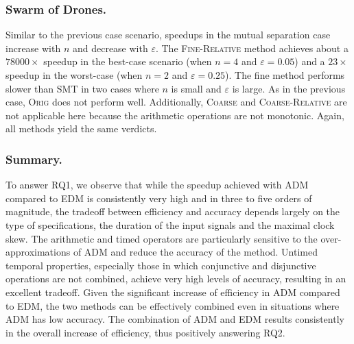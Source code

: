 \subsubsection{Swarm of Drones.}
Similar to the previous case scenario, speedups in the mutual separation case increase with \(n\) and decrease with \(\varepsilon\).
The \textsc{Fine-Relative} method achieves about a $78000\times$ speedup in the best-case scenario (when \(n=4\) and \(\varepsilon=0.05\)) and a $23\times$ speedup in the worst-case (when \(n=2\) and \(\varepsilon=0.25\)).
The fine method performs slower than SMT in two cases where \(n\) is small and \(\varepsilon\) is large.
As in the previous case, \textsc{Orig} does not perform well.
Additionally, \textsc{Coarse} and \textsc{Coarse-Relative} are not applicable here because the arithmetic operations are not monotonic.
Again, all methods yield the same verdicts.

\subsubsection{Summary.} To answer RQ1, we observe that while the speedup achieved with ADM compared to EDM is consistently very high and in three to five orders of magnitude, the tradeoff between efficiency and accuracy depends largely on the type of specifications, the duration of the input signals and the maximal clock skew. The arithmetic and timed operators are particularly sensitive to the over-approximations of ADM and reduce the accuracy of the method. Untimed temporal properties, especially those in which conjunctive and disjunctive operations are not combined, achieve very high levels of accuracy, resulting in an excellent tradeoff. Given the significant increase of efficiency in ADM compared to EDM, the two methods can be effectively combined even in situations where ADM has low accuracy. The combination of ADM and EDM results consistently in the overall increase of efficiency, thus positively answering RQ2.

